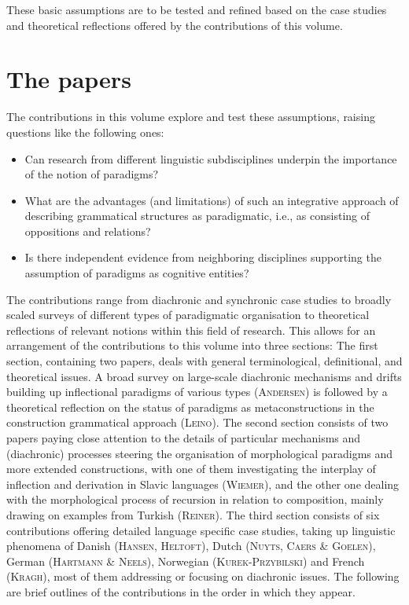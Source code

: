 \documentclass[output=paper]{langsci/langscibook}
\begin{document}
These basic assumptions are to be tested and refined based on the case studies and theoretical reflections offered by the contributions of this volume. 

\section*{The papers}

The contributions in this volume explore and test these assumptions, raising questions like the following ones:

\begin{itemize}
\item Can research from different linguistic subdisciplines underpin the importance of the notion of paradigms?
\item What are the advantages (and limitations) of such an integrative approach of describing grammatical structures as paradigmatic, i.e., as consisting of oppositions and relations?
\item Is there independent evidence from neighboring disciplines supporting the assumption of paradigms as cognitive entities?
\end{itemize}

\begin{sloppypar}The contributions range from diachronic and synchronic case studies to broadly scaled surveys of different types of paradigmatic organisation to theoretical reflections of relevant notions within this field of research. This allows for an arrangement of the contributions to this volume into three sections: The first section, containing two papers, deals with general terminological, definitional, and theoretical issues. A broad survey on large-scale diachronic mechanisms and drifts building up inflectional paradigms of various types (\textsc{Andersen}) is followed by a theoretical reflection on the status of paradigms as metaconstructions in the construction grammatical approach (\textsc{Leino}). The second section consists of two papers paying close attention to the details of particular mechanisms and (diachronic) processes steering the organisation of morphological paradigms and more extended constructions, with one of them investigating the interplay of inflection and derivation in Slavic languages (\textsc{Wiemer}), and the other one dealing with the morphological process of recursion in relation to composition, mainly drawing on examples from Turkish (\textsc{Reiner}). The third section consists of six contributions offering detailed language specific case studies, taking up linguistic phenomena of Danish (\textsc{Hansen}, \textsc{Heltoft}), Dutch (\textsc{Nuyts,} \textsc{Caers} \textsc{\&} \textsc{Goelen}), German (\textsc{Hartmann} \textsc{\&} \textsc{Neels}), Norwegian (\textsc{Kurek-Przybilski}) and French (\textsc{Kragh}), most of them addressing or focusing on diachronic issues. The following are brief outlines of the contributions in the order in which they appear.\end{sloppypar}
\end{document}
